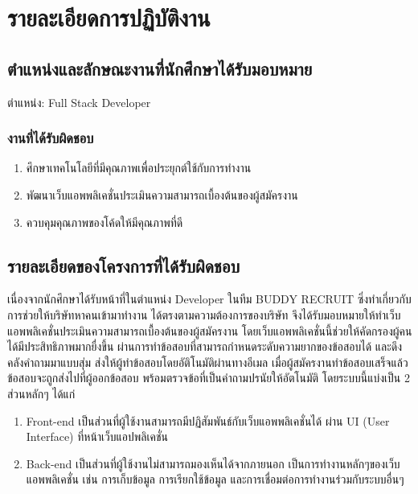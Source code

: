 \chapter{รายละเอียดการปฏิบัติงาน}
\label{chapter:related-theory}

\section{ตำแหน่งและลักษณะงานที่นักศึกษาได้รับมอบหมาย}

ตำแหน่ง: Full Stack Developer

\subsection{งานที่ได้รับผิดชอบ}

\begin{enumerate}
  \item ศึกษาเทคโนโลยีที่มีคุณภาพเพื่อประยุกต์ใช้กับการทำงาน
  \item พัฒนาเว็บแอพพลิเคชั่นประเมินความสามารถเบื้องต้นของผู้สมัครงาน
  \item ควบคุมคุณภาพของโค้ดให้มีคุณภาพที่ดี
\end{enumerate}

\section{รายละเอียดของโครงการที่ได้รับผิดชอบ}

เนื่องจากนักศึกษาได้รับหน้าที่ในตำแหน่ง Developer ในทีม BUDDY RECRUIT ซิ่งทำเกี่ยวกับการช่วยให้บริษัทหาคนเข้ามาทำงาน ได้ตรงตามความต้องการของบริษัท จึงได้รับมอบหมายให้ทำเว็บแอพพลิเคชั่นประเมินความสามารถเบื้องต้นของผู้สมัครงาน โดยเว็บแอพพลิเคชั่นนี้ช่วยให้คัดกรองผู้คนได้มีประสิทธิภาพมากยื่งขึ้น ผ่านการทำข้อสอบที่สามารถกำหนดระดับความยากของข้อสอบได้ และดึงคลังคำถามมาแบบสุ่ม ส่งให้ผู้ทำข้อสอบโดยอัติโนมัติผ่านทางอีเมล เมื่อผู้สมัครงานทำข้อสอบเสร็จแล้ว ข้อสอบจะถูกส่งไปที่ผู้ออกข้อสอบ พร้อมตรวจข้อที่เป็นคำถามปรนัยให้อัตโนมัติ โดยระบบนี้แบ่งเป็น 2 ส่วนหลักๆ ได้แก่

\begin{enumerate}
  \item Front-end เป็นส่วนที่ผู้ใช้งานสามารถมีปฏิสัมพันธ์กับเว็บแอพพลิเคชั่นได้ ผ่าน UI (User \\Interface) ที่หน้าเว็บแอปพลิเคชั่น
  \item Back-end เป็นส่วนที่ผู้ใช้งานไม่สามารถมองเห็นได้จากภายนอก เป็นการทำงานหลักๆของเว็บแอพพลิเคชั่น เช่น การเก็บข้อมูล การเรียกใช้ข้อมูล และการเชื่อมต่อการทำงานร่วมกับระบบอื่นๆ
\end{enumerate}

